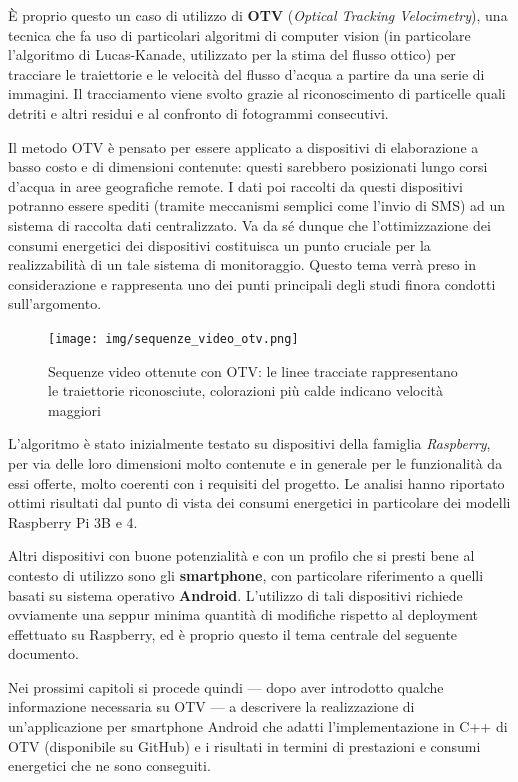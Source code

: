 È proprio questo un caso di utilizzo di \textbf{OTV} (\textit{Optical Tracking Velocimetry}), una tecnica che fa uso di 
particolari algoritmi di computer vision (in particolare l'algoritmo di Lucas-Kanade, utilizzato per la stima del flusso 
ottico) per tracciare le traiettorie e le velocità del flusso d'acqua a partire da una serie di immagini. 
Il tracciamento viene svolto grazie al riconoscimento di particelle quali detriti e altri residui e al confronto di fotogrammi 
consecutivi.

Il metodo OTV è pensato per essere applicato a dispositivi di elaborazione a basso costo e di dimensioni contenute: questi
sarebbero posizionati lungo corsi d'acqua in aree geografiche remote. I dati poi raccolti da questi dispositivi potranno essere
spediti (tramite meccanismi semplici come l'invio di SMS) ad un sistema di raccolta dati centralizzato.
Va da sé dunque che l'ottimizzazione dei consumi energetici dei dispositivi costituisca un punto cruciale per la 
realizzabilità di un tale sistema di monitoraggio. Questo tema verrà preso in considerazione e rappresenta uno dei punti
principali degli studi finora condotti sull'argomento.

\begin{figure}[h!]
    \begin{center}
        \texttt{[image: img/sequenze\_video\_otv.png]}
        \caption{Sequenze video ottenute con OTV: le linee tracciate rappresentano le traiettorie riconosciute, colorazioni
        più calde indicano velocità maggiori}
    \end{center}
\end{figure}

L'algoritmo è stato inizialmente testato su dispositivi della famiglia \textit{Raspberry}, per via delle loro dimensioni molto
contenute e in generale per le funzionalità da essi offerte, molto coerenti con i requisiti del progetto. Le analisi \cite{app11157027} 
hanno riportato ottimi risultati dal punto di vista dei consumi energetici in particolare dei modelli Raspberry Pi 3B e 4. 

Altri dispositivi con buone potenzialità e con un profilo che si presti bene al contesto di utilizzo sono gli \textbf{smartphone},
con particolare riferimento a quelli basati su sistema operativo \textbf{Android}. L'utilizzo di tali dispositivi richiede ovviamente
una seppur minima quantità di modifiche rispetto al deployment effettuato su Raspberry, ed è proprio questo il tema centrale
del seguente documento.

Nei prossimi capitoli si procede quindi --- dopo aver introdotto qualche informazione necessaria su OTV --- a descrivere 
la realizzazione di un'applicazione per smartphone Android che adatti l'implementazione in C++ di OTV (disponibile su GitHub)
e i risultati in termini di prestazioni e consumi energetici che ne sono conseguiti.




\clearpage{\pagestyle{empty}\cleardoublepage}